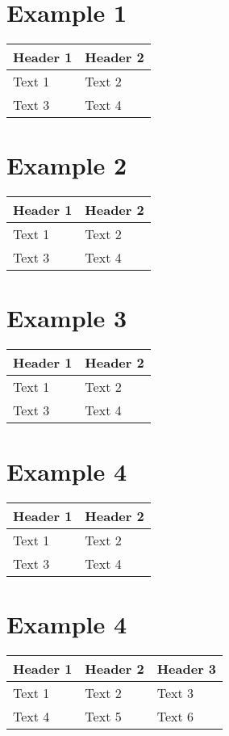 \section{Example 1}\label{example-1}

\begin{longtable}[c]{@{}ll@{}}
\toprule
Header 1 & Header 2\tabularnewline
\midrule
\endhead
Text 1 & Text 2\tabularnewline
Text 3 & Text 4\tabularnewline
\bottomrule
\end{longtable}

\section{Example 2}\label{example-2}

\begin{longtable}[c]{@{}ll@{}}
\toprule
Header 1 & Header 2\tabularnewline
\midrule
\endhead
Text 1 & Text 2\tabularnewline
Text 3 & Text 4\tabularnewline
\bottomrule
\end{longtable}

\section{Example 3}\label{example-3}

\begin{longtable}[c]{@{}ll@{}}
\toprule
Header 1 & Header 2\tabularnewline
\midrule
\endhead
Text 1 & Text 2\tabularnewline
Text 3 & Text 4\tabularnewline
\bottomrule
\end{longtable}

\section{Example 4}\label{example-4}

\begin{longtable}[c]{@{}ll@{}}
\toprule
Header 1 & Header 2\tabularnewline
\midrule
\endhead
Text 1 & Text 2\tabularnewline
Text 3 & Text 4\tabularnewline
\bottomrule
\end{longtable}

\section{Example 4}\label{example-4-1}

\begin{longtable}[c]{@{}lll@{}}
\toprule
\textbf{Header 1} & Header 2 & Header 3\tabularnewline
\midrule
\endhead
Text 1\autocite{source} & Text 2 & Text 3\tabularnewline
Text 4 & Text 5 & Text 6\tabularnewline
\bottomrule
\end{longtable}

